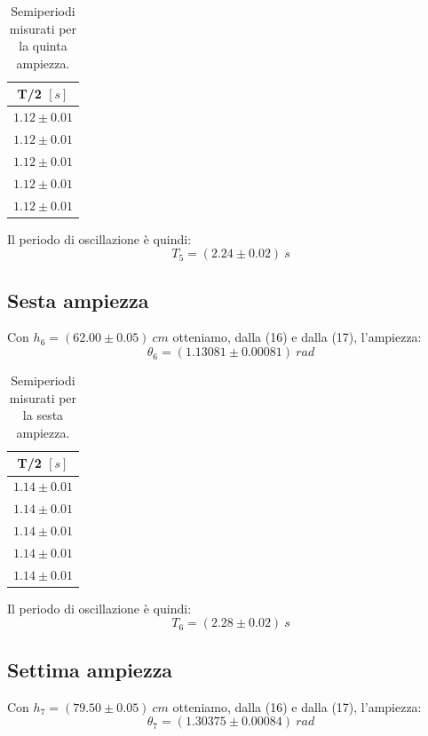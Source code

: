 \documentclass[11pt]{article}
\begin{document}
\begin{table}[H]
\centering
\begin{tabular}{|c|}
\hline
\textbf{T/2 $[s]$} \\
\hline
$1.12\pm 0.01$ \\
$1.12\pm 0.01$ \\
$1.12\pm 0.01$ \\
$1.12\pm 0.01$ \\
$1.12\pm 0.01$ \\
\hline
\end{tabular}
\caption{Semiperiodi misurati per la quinta ampiezza.}
\label{tab:}
\end{table}
Il periodo di oscillazione è quindi:
\begin{equation}
    T_5=(2.24\pm 0.02)\ s
\end{equation}

\subsection{Sesta ampiezza}
Con $h_6=(62.00\pm 0.05)\ cm$ otteniamo, dalla (16) e dalla (17), l'ampiezza:
\begin{equation}
    \theta_6=(1.13081\pm 0.00081)\ rad
\end{equation}

\begin{table}[H]
\centering
\begin{tabular}{|c|}
\hline
\textbf{T/2 $[s]$} \\
\hline
$1.14\pm 0.01$ \\
$1.14\pm 0.01$ \\
$1.14\pm 0.01$ \\
$1.14\pm 0.01$ \\
$1.14\pm 0.01$ \\
\hline
\end{tabular}
\caption{Semiperiodi misurati per la sesta ampiezza.}
\label{tab:}
\end{table}
Il periodo di oscillazione è quindi:
\begin{equation}
    T_6=(2.28\pm 0.02)\ s
\end{equation}

\subsection{Settima ampiezza}
Con $h_7=(79.50\pm 0.05)\ cm$ otteniamo, dalla (16) e dalla (17), l'ampiezza:
\begin{equation}
    \theta_7=(1.30375\pm 0.00084)\ rad
\end{equation}
\end{document}
